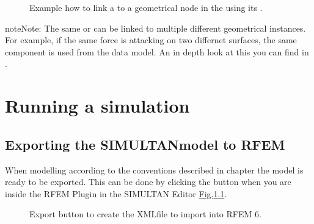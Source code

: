 \documentclass[letterpaper,10pt,english]{jupyterBook}
\let\sphinxpxdimen\pdfpxdimen\else\newdimen\sphinxpxdimen
\begin{document}
\begin{figure}[htbp]
\centering
\capstart

\noindent\sphinxincludegraphics[height=500\sphinxpxdimen]{{add_load}.png}
\caption{Example how to link a  to a geometrical node in the  using its .}\label{\detokenize{Setting_up_a_problem:add-load}}\end{figure}

\begin{sphinxadmonition}{note}{Note:}
\sphinxAtStartPar
The same  or  can be linked to multiple different geometrical instances.
For example, if the same force is attacking on two differnet surfaces, the same component is used from the data model.
An in depth look at this you can find in {\hyperref[\detokenize{SIMULTAN_Datastructure_to_incorporate_the_RFem_Data_model::doc}]{}}.
\end{sphinxadmonition}

\sphinxstepscope


\chapter{Running a simulation}
\label{\detokenize{Running_a_simulation:running-a-simulation}}\label{\detokenize{Running_a_simulation:id1}}\label{\detokenize{Running_a_simulation::doc}}

\section{Exporting the SIMULTAN\sphinxhyphen{}model to RFEM}
\label{\detokenize{Running_a_simulation:exporting-the-simultan-model-to-rfem}}
\sphinxAtStartPar
When modelling according to the conventions described in chapter {\hyperref[\detokenize{Setting_up_a_problem::doc}]{}} the
model is ready to be exported. This can be done by clicking the  button when you are inside the RFEM Plugin in
the SIMULTAN Editor \hyperref[\detokenize{Running_a_simulation:export}]{Fig.\@ \ref{\detokenize{Running_a_simulation:export}}}.

\begin{figure}[htbp]
\centering
\capstart

\noindent\sphinxincludegraphics[height=250\sphinxpxdimen]{{export}.png}
\caption{Export button to create the XML\sphinxhyphen{}file to import into RFEM 6.}\label{\detokenize{Running_a_simulation:export}}\end{figure}
\end{document}
